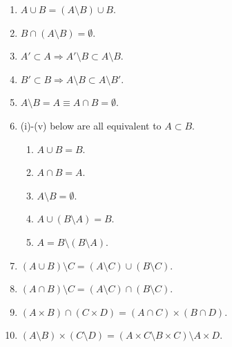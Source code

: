 \documentclass[a4paper,12pt]{article}
\begin{document}
\begin{prp}
\begin{enumerate}
		\item \label{enu:set_basic_cup_decomposition}
		      \( A \cup B = (A\setminus B) \cup B \).
		      
		\item \label{enu:set_basic_setminus_disjoint}
		      \( B \cap (A \setminus B) = \emptyset \).
		      
		\item \label{enu:set_basic_bigger_setminus}
		      \( A' \subset A \Rightarrow A' \setminus B \subset A \setminus B\).
		      
		\item \label{enu:set_basic_setminus_bigger}
		      \( B' \subset B \Rightarrow A \setminus B \subset A \setminus B'\).
		      
		\item \label{enu:set_basic_equiv_disjoint}
		      \( A \setminus B =A \equiv A\cap B = \emptyset \).
		      
		\item \label{enu:set_basic_equiv_inclusion}
		      (i)-(v) below are all equivalent to \( A\subset B \).
		      \begin{enumerate}
			      \item \( A\cup B =B \).
			      \item \( A\cap B =A \).
			      \item \( A \setminus B = \emptyset \).
			      \item \( A\cup (B\setminus A)=B \).
			      \item \( A= B \setminus(B \setminus A) \).
		      \end{enumerate}
		\item \label{enu:set_basic_cup_setminus}
		      \( (A\cup B)\setminus C = (A \setminus C) \cup (B \setminus C) \).
		      
		\item \label{enu:set_basic_cap_setminus}
		      \( (A\cap B)\setminus C = (A \setminus C) \cap (B \setminus C) \).
		      
		\item \label{enu:set_basic_times_cap}
		      \( (A\times B) \cap (C \times D) = (A \cap C) \times (B \cap D) \).
		      
		      
		\item \label{enu:set_basic_setminus_times}
		      \( (A \setminus B) \times  (C \setminus D) = (A \times C \setminus B \times C) \setminus A \times D \).
	\end{enumerate}
\end{prp}
\end{document}
